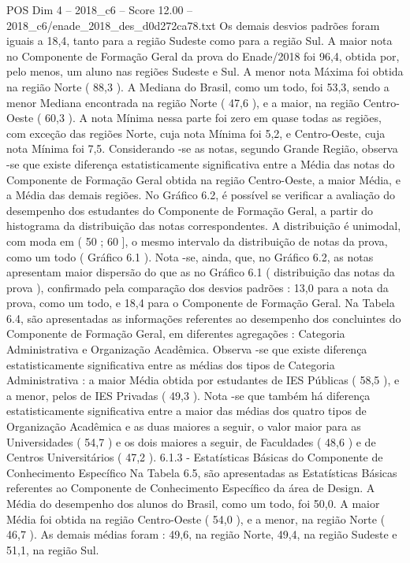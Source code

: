 \begin{textsample}{POS Dim 4 – 2018\_c6 – Score 12.00 – 2018\_c6/enade\_2018\_des\_d0d272ca78.txt}
Os demais desvios padrões foram iguais a 18,4, tanto para a região Sudeste como para a região Sul.
A maior nota no Componente de Formação Geral da prova do Enade/2018 foi 96,4, obtida por, pelo menos, um aluno nas regiões Sudeste e Sul.
A menor nota Máxima foi obtida na região Norte ( 88,3 ).
A Mediana do Brasil, como um todo, foi 53,3, sendo a menor Mediana encontrada na região Norte ( 47,6 ), e a maior, na região Centro-Oeste ( 60,3 ).
A nota Mínima nessa parte foi zero em quase todas as regiões, com exceção das regiões Norte, cuja nota Mínima foi 5,2, e Centro-Oeste, cuja nota Mínima foi 7,5.
Considerando -se as notas, segundo Grande Região, observa -se que existe diferença estatisticamente significativa entre a Média das notas do Componente de Formação Geral obtida na região Centro-Oeste, a maior Média, e a Média das demais regiões.
No Gráfico 6.2, é possível se verificar a avaliação do desempenho dos estudantes do Componente de Formação Geral, a partir do histograma da distribuição das notas correspondentes.
A distribuição é unimodal, com moda em ( 50 ; 60 ], o mesmo intervalo da distribuição de notas da prova, como um todo ( Gráfico 6.1 ).
Nota -se, ainda, que, no Gráfico 6.2, as notas apresentam maior dispersão do que as no Gráfico 6.1 ( distribuição das notas da prova ), confirmado pela comparação dos desvios padrões : 13,0 para a nota da prova, como um todo, e 18,4 para o Componente de Formação Geral.
Na Tabela 6.4, são apresentadas as informações referentes ao desempenho dos concluintes do Componente de Formação Geral, em diferentes agregações : Categoria Administrativa e Organização Acadêmica.
Observa -se que existe diferença estatisticamente significativa entre as médias dos tipos de Categoria Administrativa : a maior Média obtida por estudantes de IES Públicas ( 58,5 ), e a menor, pelos de IES Privadas ( 49,3 ).
Nota -se que também há diferença estatisticamente significativa entre a maior das médias dos quatro tipos de Organização Acadêmica e as duas maiores a seguir, o valor maior para as Universidades ( 54,7 ) e os dois maiores a seguir, de Faculdades ( 48,6 ) e de Centros Universitários ( 47,2 ). 6.1.3 - Estatísticas Básicas do Componente de Conhecimento Específico Na Tabela 6.5, são apresentadas as Estatísticas Básicas referentes ao Componente de Conhecimento Específico da área de Design.
A Média do desempenho dos alunos do Brasil, como um todo, foi 50,0.
A maior Média foi obtida na região Centro-Oeste ( 54,0 ), e a menor, na região Norte ( 46,7 ).
As demais médias foram : 49,6, na região Norte, 49,4, na região Sudeste e 51,1, na região Sul.

\end{textsample}
